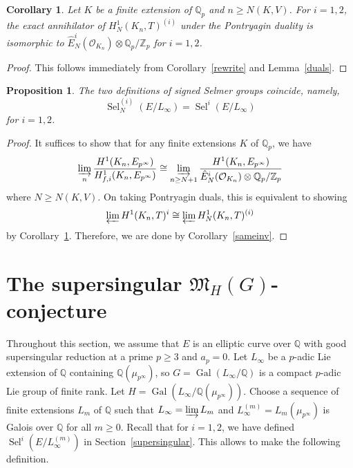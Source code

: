 \documentclass{amsart}
\newcommand{\QQ}{\mathbb Q}
\newcommand{\ZZ}{\mathbb Z}
\DeclareMathOperator{\Sel}{Sel}
\DeclareMathOperator{\Gal}{Gal}
\newcommand{\Ep}{E_{p^\infty}}
\newcommand{\Qp}{\QQ_p}
\newcommand{\Zp}{\ZZ_p}
\newcommand{\calO}{\mathcal{O}}
\newtheorem{proposition}[theorem]{Proposition}
\newtheorem{corollary}[theorem]{Corollary}
\begin{document}
  \begin{corollary}\label{orthdual}
   Let $K$ be a finite extension of $\Qp$ and $n\ge N(K,V)$. For $i=1,2$, the exact annihilator of $H_N^1(K_n,T)^{(i)}$ under the Pontryagin duality
   is isomorphic to $\hat{E}_N^i(\calO_{K_{n}})\otimes\Qp/\Zp$ for $i=1,2$.
  \end{corollary}
  \begin{proof}
   This follows immediately from Corollary~\ref{rewrite} and Lemma~\ref{duals}.
  \end{proof}


  \begin{proposition}\label{samesel}
   The two definitions of signed Selmer groups coincide, namely, 
   \[
   \Sel^{(i)}_N(E/L_\infty)=\Sel^i(E/L_\infty)
   \]
   for $i=1,2$.
  \end{proposition}
  \begin{proof}
   It suffices to show that for any finite extensions $K$ of $\Qp$, we have
   \[
    \varinjlim_n\frac{H^1(K_{n},\Ep)}{H^1_{f,i}(K_{n},\Ep)}\cong\varinjlim_{n\ge N+1}\frac{H^1(K_{n},\Ep)}{\hat{E}_N^i(\calO_{K_{n}})\otimes\Qp/\Zp}
   \]
   where $N\ge N(K,V)$. On taking Pontryagin duals, this is equivalent to showing
   \[
    \varprojlim H^1(K_n,T)^{i}\cong\varprojlim H^1_N(K_n,T)^{(i)}
   \]
   by Corollary~\ref{orthdual}. Therefore, we are done by Corollary~\ref{sameinv}.
  \end{proof}
  

\section{The supersingular $\mathfrak{M}_H(G)$-conjecture}\label{MHG}

  Throughout this section, we assume that $E$ is an elliptic curve over $\QQ$ with good supersingular reduction at a prime $p\geq 3$ and $a_p=0$. Let $L_\infty$ be a $p$-adic Lie extension of $\QQ$ containing $\QQ(\mu_{p^\infty})$, so $G=\Gal(L_\infty\slash\QQ)$ is a compact $p$-adic Lie group of finite rank. Let $H=\Gal(L_\infty\slash \QQ(\mu_{p^\infty}))$.  Choose a sequence of finite extensions $L_m$ of $\QQ$ such that $L_\infty=\varinjlim L_m$ and $L^{(m)}_\infty=L_m(\mu_{p^\infty})$ is Galois over $\QQ$ for all $m\geq 0$. Recall that for $i=1,2$, we have defined $\Sel^i(E/L^{(m)}_\infty)$ in Section~\ref{supersingular}. This allows to make the following definition. 
  
\end{document}
